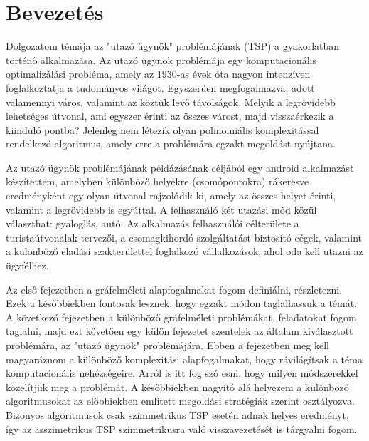 \chapter{Bevezetés}\label{ch:ALAP}

Dolgozatom témája az "utazó ügynök" problémájának (TSP) a gyakorlatban történő alkalmazása. Az utazó ügynök problémája egy komputacionális optimalizálási probléma, amely az 1930-as évek óta nagyon intenzíven foglalkoztatja a tudományos világot. Egyszerűen megfogalmazva: adott valamennyi város, valamint az köztük levő távolságok. Melyik a legrövidebb lehetséges útvonal, ami egyszer érinti az összes várost, majd visszaérkezik a kiinduló pontba? Jelenleg nem létezik olyan polinomiális komplexitással rendelkező algoritmus, amely erre a problémára egzakt megoldást nyújtana.

Az utazó ügynök problémájának példázásának céljából egy android alkalmazást készítettem, amelyben különböző helyekre (csomópontokra) rákeresve eredményként egy olyan útvonal rajzolódik ki, amely az összes helyet érinti, valamint a legrövidebb is egyúttal. A felhasználó két utazási mód közül választhat: gyaloglás, autó. Az alkalmazás felhasználói célterülete a turistaútvonalak tervezői, a csomagkihordó szolgáltatást biztosító cégek, valamint a különböző eladási szakterülettel foglalkozó vállalkozások, ahol oda kell utazni az ügyfélhez.

Az első fejezetben a gráfelméleti alapfogalmakat fogom definiálni, részletezni. Ezek a későbbiekben fontosak lesznek, hogy egzakt módon taglalhassuk a témát. A következő fejezetben a különböző gráfelméleti problémákat, feladatokat fogom taglalni, majd ezt követően egy külön fejezetet szentelek az általam kiválasztott problémára, az "utazó ügynök" problémájára. Ebben a fejezetben meg kell magyaráznom a különböző komplexitási alapfogalmakat, hogy rávilágítsak a téma komputacionális nehézségeire. Arról is itt fog szó esni, hogy milyen módszerekkel közelítjük meg a problémát. A későbbiekben nagyító alá helyezem a különböző algoritmusokat az előbbiekben emlitett megoldási stratégiák szerint osztályozva. Bizonyos algoritmusok csak szimmetrikus TSP esetén adnak helyes eredményt, így az asszimetrikus TSP szimmetrikusra való visszavezetését is tárgyalni fogom.

